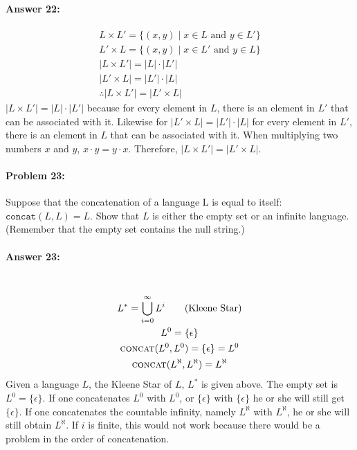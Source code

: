 \documentclass[12pt, letterpaper]{article}
\begin{document}
\paragraph{Answer 22:} \begin{gather*}
    L \times L' = \{(x, y) \mid x \in L \text{ and } y \in L'\}\\
    L' \times L = \{(x, y) \mid x \in L' \text{ and } y \in L\}\\
    |L \times L'|  = |L|\cdot{|L'|}\\
    |L' \times L|  = |L'|\cdot{|L|}\\
    \therefore |L \times L'| = |L' \times L|
\end{gather*}
$|L \times L'|  = |L|\cdot{|L'|}$ because for every element in $L$, there is an element in $L'$ that can be associated with it. Likewise for $|L' \times L|  = |L'|\cdot{|L|}$ for every element in $L'$, there is an element in $L$ that can be associated with it. When multiplying two numbers $x$ and $y$, $x\cdot{y} = y\cdot{x}$. Therefore, $|L \times L'| = |L' \times L|$.

\hrulefill
\paragraph{Problem 23:}
Suppose that the concatenation of a language L is equal to itself:
$\texttt{concat}(L,L) = L$. Show that $L$ is either the empty set or
an infinite language. (Remember that the empty set contains the null
string.)

\paragraph{Answer 23:}~\begin{gather*}
    L^{*} = \bigcup\limits_{i=0}^{\infty} L^i \tag{Kleene Star}\\
    L^{0} = \{\epsilon\}\\
    \textsc{concat}(L^{0},L^{0}) = \{\epsilon\} = L^{0}\\
     \textsc{concat}(L^{\aleph},L^{\aleph}) = L^{\aleph}
\end{gather*}
Given a language $L$, the Kleene Star of $L$, $L^{*}$ is given above. The empty set is $L^0 = \{\epsilon\}$. If one concatenates $L^0$ with $L^0$, or $\{\epsilon\}$ with $\{\epsilon\}$  he or she will still get $\{\epsilon\}$. If one concatenates the countable infinity, namely $L^{\aleph}$ with $L^{\aleph}$, he or she will still obtain $L^{\aleph}$. If $i$ is finite, this would not work because there would be a problem in the order of concatenation.
\end{document}
